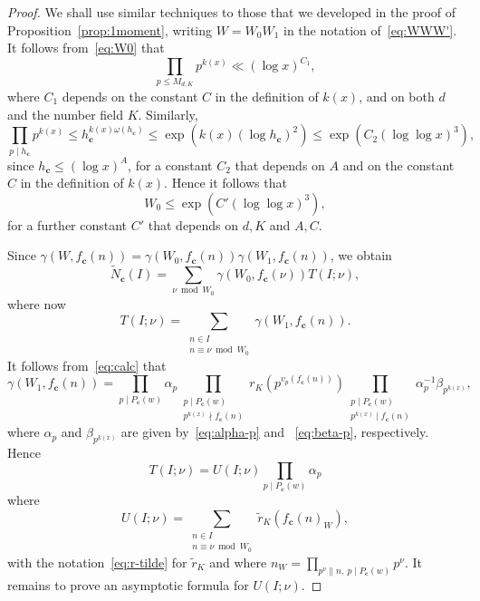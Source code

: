 \documentclass[10pt,a4paper]{amsart}
\renewcommand{\c}{\mathbf{c}}
\renewcommand{\leq}{\leqslant}
\begin{document}
\begin{proof}
We shall use 
similar techniques to those that we developed in the proof of 
Proposition~\ref{prop:1moment}, writing $W=W_0W_1$ in the notation of~\eqref{eq:WWW'}.
It follows from~\eqref{eq:W0} that 
$$
\prod_{p\leq M_{d,K}} p^{k(x)}\ll (\log x)^{C_1},
$$ 
where $C_1$  depends on the constant $C$ in the definition of $k(x)$, and on both $d$ and the number field $K$.
Similarly, 
$$
\prod_{p\mid h_\c} p^{k(x)}\leq h_\c^{k(x)\omega(h_\c)}\leq 
\exp\left(k(x)(\log h_\c)^2\right)\leq \exp\left(C_2(\log\log x)^3\right),
$$ 
since $h_\c\leq (\log x)^A$, 
for a constant $C_2$ that depends on $A$ and  
on the constant $C$ in the definition of $k(x)$. Hence it follows that 
\begin{equation}\label{eq:oat}
W_0\leq \exp\left(C'(\log\log x)^3\right),
\end{equation}
for a further constant $C'$ that depends on $d,K$ and $A,C$.


Since   $\gamma(W,f_\c(n))=\gamma(W_0,f_\c(n))\gamma(W_1,f_\c(n))$, we obtain
\begin{equation}\label{eq:S-to-T'}
\tilde N_{\c}(I)=
\sum_{\nu \bmod{W_0}} \gamma(W_0,f_\c(\nu))T(I;\nu), 
\end{equation}
where now
$$
T(I;\nu)=
\sum_{\substack{n\in I\\ 
n\equiv \nu\bmod{W_0}}}
\gamma(W_1,f_\c(n)).
$$
It follows from~\eqref{eq:calc} 
that 
$$
\gamma(W_1,f_\c(n))
=\prod_{p\mid P_\c(w)} \alpha_p
\prod_{\substack{p\mid P_\c(w)\\
p^{k(x)}\nmid f_\c(n)}}
r_K(p^{v_p(f_\c(n))}) 
\prod_{\substack{p\mid P_\c(w)\\
p^{k(x)}\mid f_\c(n)
}}
\alpha_p^{-1}\beta_{p^{k(x)}},
$$
where $\alpha_p$ and $ \beta_{p^{k(x)}}$ are given by~\eqref{eq:alpha-p} and ~\eqref{eq:beta-p}, 
respectively.
Hence
\begin{equation}\label{eq:pigeon}
T(I;\nu)=
U(I;\nu)\prod_{p\mid P_\c(w)} \alpha_p
\end{equation}
where
$$
U(I;\nu)=\sum_{\substack{n\in I
\\ n\equiv \nu\bmod{W_0}}} \tilde r_K(f_\c(n)_W),
$$
with the notation~\eqref{eq:r-tilde} for $\tilde r_K$ and where
$
n_W=\prod_{p^\nu \| n,~ p\mid P_\c(w)}p^\nu.
$
It remains to prove an asymptotic formula for $U(I;\nu)$.

 


\end{proof}
\end{document}
